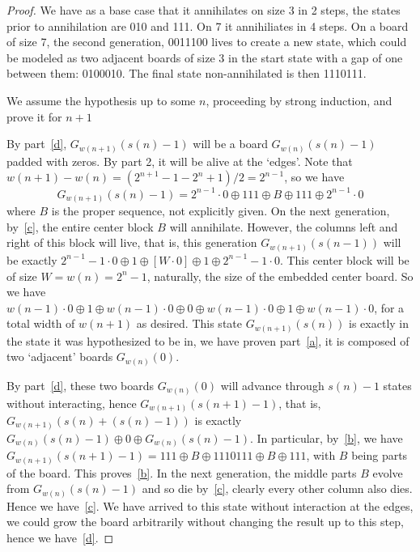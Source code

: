 \documentclass[12pt,letterpaper]{article}
\begin{document}
\begin{proof}
We have as a base case that it annihilates on size 3 in 2 steps, the states prior to annihilation are 010 and 111. On 7 it annihiliates in 4 steps. On a board of size 7, the second generation, 0011100 lives to create a new state, which could be modeled as two adjacent boards of size 3 in the start state with a gap of one between them: 0100010. The final state non-annihilated is then 1110111.


We assume the hypothesis up to some $n$, proceeding by strong induction, and prove it for $n+1$

By part~\ref{d}, $G_{w(n+1)}(s(n)-1)$ will be a board $G_{w(n)}(s(n)-1)$ padded with zeros. By part 2, it will be alive at the `edges'. Note that $w(n+1)-w(n)=(2^{n+1}-1-2^{n}+1)/2=2^{n-1}$, so we have
$$G_{w(n+1)}(s(n)-1) = 2^{n-1}\cdot 0 \oplus 111 \oplus B \oplus 111 \oplus 2^{n-1}\cdot 0$$
where $B$ is the proper sequence, not explicitly given. On the next generation, by~\ref{c}, the entire center block $B$ will annihilate. However, the columns left and right of this block will live, that is, this generation $G_{w(n+1)}(s(n-1))$ will be exactly $2^{n-1}-1\cdot 0 \oplus 1 \oplus [W\cdot 0]\oplus 1 \oplus 2^{n-1}-1\cdot 0$. This center block will be of size $W=w(n)=2^n-1$, naturally, the size of the embedded center board. So we have $w(n-1)\cdot 0\oplus 1 \oplus w(n-1)\cdot 0\oplus 0 \oplus w(n-1)\cdot 0\oplus 1\oplus w(n-1)\cdot 0$, for a total width of $w(n+1)$ as desired. This state $G_{w(n+1)}(s(n))$ is exactly in the state it was hypothesized to be in, we have proven part~\ref{a}, it is composed of two `adjacent' boards $G_{w(n)}(0)$.

By part~\ref{d}, these two boards $G_{w(n)}(0)$ will advance through $s(n)-1$ states without interacting, hence $G_{w(n+1)}(s(n+1)-1)$, that is, $G_{w(n+1)}(s(n)+(s(n)-1))$ is exactly $G_{w(n)}(s(n)-1) \oplus 0 \oplus G_{w(n)}(s(n)-1)$. In particular, by~\ref{b}, we have $G_{w(n+1)}(s(n+1)-1) = 111 \oplus B \oplus 1110111 \oplus B \oplus 111$, with $B$ being parts of the board. This proves~\ref{b}. In the next generation, the middle parts $B$ evolve from $G_{w(n)}(s(n)-1)$ and so die by~\ref{c}, clearly every other column also dies. Hence we have~\ref{c}. We have arrived to this state without interaction at the edges, we could grow the board arbitrarily without changing the result up to this step, hence we have~\ref{d}.

\end{proof}
\end{document}
